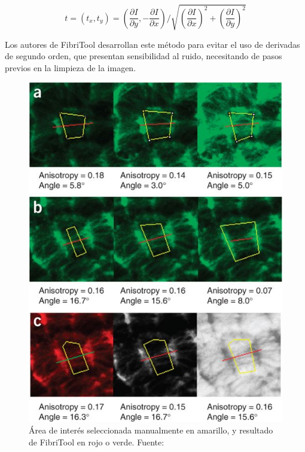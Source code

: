 \begin{equation}
\label{eq:fibritoolTensor}
t = (t_x,t_y) = (
\frac{\partial I}{\partial y}, -\frac{\partial I}{\partial x}) / \sqrt{  
(\frac{\partial I}{\partial x})^2 + 
(\frac{\partial I}{\partial y})^2 }
\end{equation}
 
Los autores de FibriTool desarrollan este m\'etodo para evitar el uso de derivadas de segundo orden, que presentan sensibilidad al ruido, necesitando de pasos previos en la limpieza de la imagen.

\begin{figure}[h!]
        \centering
        \includegraphics[scale=0.6]{imagenes/fibritool.jpg}
        \caption{\'Area de inter\'es seleccionada manualmente en amarillo, y resultado de FibriTool en rojo o verde. Fuente: \cite{boudaoud2014fibriltool}}
        \label{fig:fibritool}
\end{figure}

